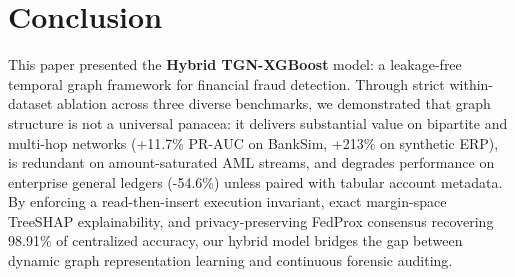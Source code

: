 \documentclass[journal]{IEEEtran}
\begin{document}
\section{Conclusion}\label{sec:conclusion}
This paper presented the \textbf{Hybrid TGN-XGBoost} model: a leakage-free temporal graph framework for financial fraud detection. Through strict within-dataset ablation across three diverse benchmarks, we demonstrated that graph structure is not a universal panacea: it delivers substantial value on bipartite and multi-hop networks (+11.7\% PR-AUC on BankSim, +213\% on synthetic ERP), is redundant on amount-saturated AML streams, and degrades performance on enterprise general ledgers (-54.6\%) unless paired with tabular account metadata. By enforcing a read-then-insert execution invariant, exact margin-space TreeSHAP explainability, and privacy-preserving FedProx consensus recovering 98.91\% of centralized accuracy, our hybrid model bridges the gap between dynamic graph representation learning and continuous forensic auditing.
\end{document}
